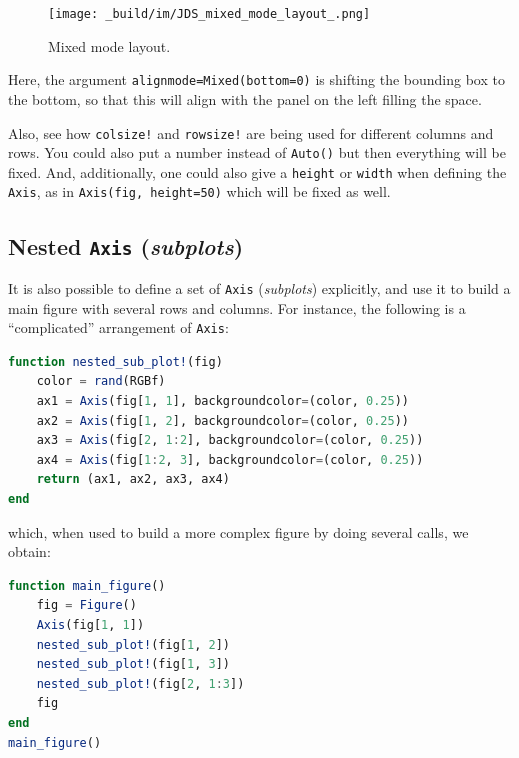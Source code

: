 \documentclass[
  notoc %
]{tufte-book}
\newcommand{\passthrough}[1]{#1}
\begin{document}
\begin{figure}
\hypertarget{fig:mixed_mode_layout}{%
\centering
\texttt{[image: \_build/im/JDS\_mixed\_mode\_layout\_.png]}
\caption{Mixed mode layout.}\label{fig:mixed_mode_layout}
}
\end{figure}

Here, the argument \passthrough{\lstinline!alignmode=Mixed(bottom=0)!}
is shifting the bounding box to the bottom, so that this will align with
the panel on the left filling the space.

Also, see how \passthrough{\lstinline"colsize!"} and
\passthrough{\lstinline"rowsize!"} are being used for different columns
and rows. You could also put a number instead of
\passthrough{\lstinline!Auto()!} but then everything will be fixed. And,
additionally, one could also give a \passthrough{\lstinline!height!} or
\passthrough{\lstinline!width!} when defining the
\passthrough{\lstinline!Axis!}, as in
\passthrough{\lstinline!Axis(fig, height=50)!} which will be fixed as
well.

\hypertarget{nested-axis-subplots}{%
\subsection{\texorpdfstring{Nested \texttt{Axis}
(\emph{subplots})}{Nested Axis (subplots)}}\label{nested-axis-subplots}}

It is also possible to define a set of \passthrough{\lstinline!Axis!}
(\emph{subplots}) explicitly, and use it to build a main figure with
several rows and columns. For instance, the following is a
``complicated'' arrangement of \passthrough{\lstinline!Axis!}:

\begin{lstlisting}[language=Julia]
function nested_sub_plot!(fig)
    color = rand(RGBf)
    ax1 = Axis(fig[1, 1], backgroundcolor=(color, 0.25))
    ax2 = Axis(fig[1, 2], backgroundcolor=(color, 0.25))
    ax3 = Axis(fig[2, 1:2], backgroundcolor=(color, 0.25))
    ax4 = Axis(fig[1:2, 3], backgroundcolor=(color, 0.25))
    return (ax1, ax2, ax3, ax4)
end
\end{lstlisting}

which, when used to build a more complex figure by doing several calls,
we obtain:

\begin{lstlisting}[language=Julia]
function main_figure()
    fig = Figure()
    Axis(fig[1, 1])
    nested_sub_plot!(fig[1, 2])
    nested_sub_plot!(fig[1, 3])
    nested_sub_plot!(fig[2, 1:3])
    fig
end
main_figure()
\end{lstlisting}
\end{document}
